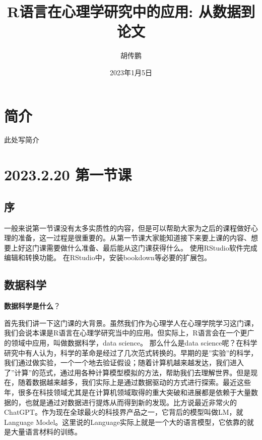 \documentclass[
  oneside]{book}
\title{R语言在心理学研究中的应用: 从数据到论文}
\author{胡传鹏}
\date{2023年1月5日}
\begin{document}
\maketitle

{
\setcounter{tocdepth}{1}
\tableofcontents
}
\hypertarget{ux7b80ux4ecb}{%
\chapter*{简介}\label{ux7b80ux4ecb}}

此处写简介

\hypertarget{lesson-1}{%
\chapter{2023.2.20 第一节课}\label{lesson-1}}

\hypertarget{1-intro}{%
\section{序}\label{1-intro}}

一般来说第一节课没有太多实质性的内容，但是可以帮助大家为之后的课程做好心理的准备，这一过程是很重要的。从第一节课大家能知道接下来要上课的内容、想要上好这门课需要做什么准备、最后能从这门课获得什么。
使用RStudio软件完成编辑和转换功能。
在RStudio中，安装bookdown等必要的扩展包。

\hypertarget{1-data-science}{%
\section{数据科学}\label{1-data-science}}

\textbf{数据科学是什么}？

首先我们讲一下这门课的大背景。虽然我们作为心理学人在心理学院学习这门课，我们会说本课是R语言在心理学研究当中的应用。但实际上，R语言会在一个更广的领域中应用，叫做数据科学，data science。 那么什么是data science呢？在科学研究中有人认为，科学的革命是经过了几次范式转换的。早期的是''实验''的科学，我们通过做实验，一个一个地去验证假设；随着计算机越来越发达，我们进入了''计算''的范式，通过用各种计算模型模拟的方法，帮助我们去理解世界。但是现在，随着数据越来越多，我们实际上是通过数据驱动的方式进行探索。最近这些年，很多在科技领域尤其是在计算机领域取得的重大突破和进展都是依赖于大量数据的，也就是通过对数据进行提炼从而得到新的发现。比方说最近非常火的ChatGPT。作为现在全球最火的科技界产品之一，它背后的模型叫做LM，就Language Model。这里说的Language实际上就是一个大的语言模型，它依靠的就是大量语言材料的训练。
\end{document}
